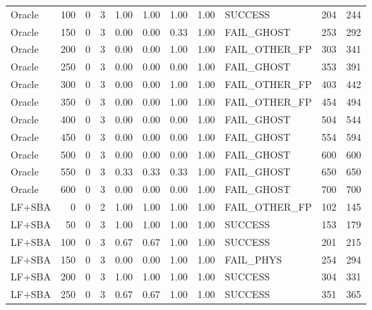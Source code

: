\begin{tabular}{lrrr|rrrr|lrr}
  Oracle                         &  100 &    0 &   3 & 1.00 & 1.00 & 1.00 & 1.00 & SUCCESS         &   204 &   244 \\
  Oracle                         &  150 &    0 &   3 & 0.00 & 0.00 & 0.33 & 1.00 & FAIL_GHOST      &   253 &   292 \\
  Oracle                         &  200 &    0 &   3 & 0.00 & 0.00 & 1.00 & 1.00 & FAIL_OTHER_FP   &   303 &   341 \\
  Oracle                         &  250 &    0 &   3 & 0.00 & 0.00 & 0.00 & 1.00 & FAIL_GHOST      &   353 &   391 \\
  Oracle                         &  300 &    0 &   3 & 0.00 & 0.00 & 1.00 & 1.00 & FAIL_OTHER_FP   &   403 &   442 \\
  Oracle                         &  350 &    0 &   3 & 0.00 & 0.00 & 1.00 & 1.00 & FAIL_OTHER_FP   &   454 &   494 \\
  Oracle                         &  400 &    0 &   3 & 0.00 & 0.00 & 0.00 & 1.00 & FAIL_GHOST      &   504 &   544 \\
  Oracle                         &  450 &    0 &   3 & 0.00 & 0.00 & 0.00 & 1.00 & FAIL_GHOST      &   554 &   594 \\
  Oracle                         &  500 &    0 &   3 & 0.00 & 0.00 & 0.00 & 1.00 & FAIL_GHOST      &   600 &   600 \\
  Oracle                         &  550 &    0 &   3 & 0.33 & 0.33 & 0.33 & 1.00 & FAIL_GHOST      &   650 &   650 \\
  Oracle                         &  600 &    0 &   3 & 0.00 & 0.00 & 0.00 & 1.00 & FAIL_GHOST      &   700 &   700 \\
  LF+SBA                         &    0 &    0 &   2 & 1.00 & 1.00 & 1.00 & 1.00 & FAIL_OTHER_FP   &   102 &   145 \\
  LF+SBA                         &   50 &    0 &   3 & 1.00 & 1.00 & 1.00 & 1.00 & SUCCESS         &   153 &   179 \\
  LF+SBA                         &  100 &    0 &   3 & 0.67 & 0.67 & 1.00 & 1.00 & SUCCESS         &   201 &   215 \\
  LF+SBA                         &  150 &    0 &   3 & 0.00 & 0.00 & 1.00 & 1.00 & FAIL_PHYS       &   254 &   294 \\
  LF+SBA                         &  200 &    0 &   3 & 1.00 & 1.00 & 1.00 & 1.00 & SUCCESS         &   304 &   331 \\
  LF+SBA                         &  250 &    0 &   3 & 0.67 & 0.67 & 1.00 & 1.00 & SUCCESS         &   351 &   365 \\

\end{tabular}
